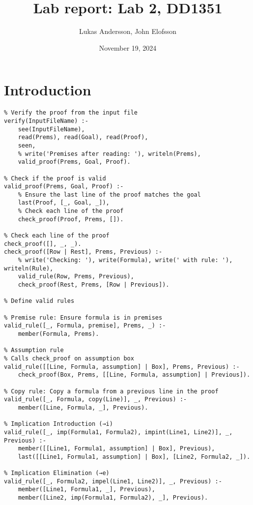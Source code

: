 \documentclass[a4paper,11pt]{article}
\begin{document}
\title{
    \textbf{Lab report: Lab 2, DD1351}
}
\author{Lukas Andersson, John Elofsson}
\date{November 19, 2024}

\maketitle

\section*{Introduction}

\begin{verbatim}
% Verify the proof from the input file
verify(InputFileName) :-
    see(InputFileName),
    read(Prems), read(Goal), read(Proof),
    seen,
    % write('Premises after reading: '), writeln(Prems),
    valid_proof(Prems, Goal, Proof).

% Check if the proof is valid
valid_proof(Prems, Goal, Proof) :-
    % Ensure the last line of the proof matches the goal
    last(Proof, [_, Goal, _]),
    % Check each line of the proof
    check_proof(Proof, Prems, []).

% Check each line of the proof
check_proof([], _, _).
check_proof([Row | Rest], Prems, Previous) :-
    % write('Checking: '), write(Formula), write(' with rule: '), writeln(Rule),
    valid_rule(Row, Prems, Previous),
    check_proof(Rest, Prems, [Row | Previous]).

% Define valid rules

% Premise rule: Ensure formula is in premises
valid_rule([_, Formula, premise], Prems, _) :-
    member(Formula, Prems).

% Assumption rule
% Calls check_proof on assumption box
valid_rule([[Line, Formula, assumption] | Box], Prems, Previous) :-
    check_proof(Box, Prems, [[Line, Formula, assumption] | Previous]).

% Copy rule: Copy a formula from a previous line in the proof
valid_rule([_, Formula, copy(Line)], _, Previous) :-
    member([Line, Formula, _], Previous).

% Implication Introduction (→i)
valid_rule([_, imp(Formula1, Formula2), impint(Line1, Line2)], _, Previous) :-
    member([[Line1, Formula1, assumption] | Box], Previous),
    last([[Line1, Formula1, assumption] | Box], [Line2, Formula2, _]).

% Implication Elimination (→e)
valid_rule([_, Formula2, impel(Line1, Line2)], _, Previous) :-
    member([Line1, Formula1, _], Previous),
    member([Line2, imp(Formula1, Formula2), _], Previous).


\end{verbatim}
\end{document}
